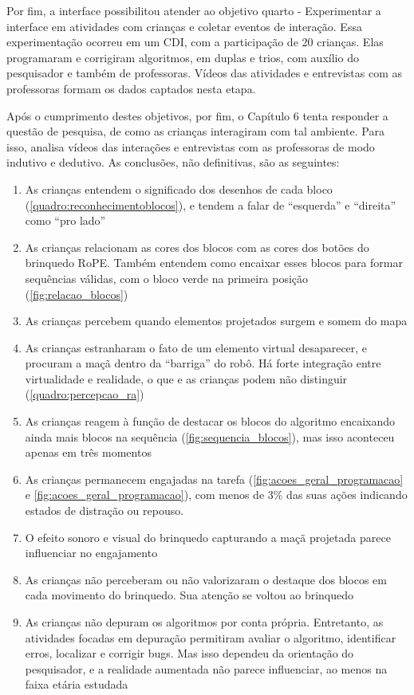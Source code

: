 Por fim, a interface possibilitou atender ao objetivo quarto - Experimentar a interface em atividades com crianças e coletar eventos de interação. Essa experimentação ocorreu em um CDI, com a participação de 20 crianças. Elas programaram e corrigiram algoritmos, em duplas e trios, com auxílio do pesquisador e também de professoras. Vídeos das atividades e entrevistas com as professoras formam os dados captados nesta etapa.

Após o cumprimento destes objetivos, por fim, o Capítulo 6 tenta responder a questão de pesquisa, de como as crianças interagiram com tal ambiente. Para isso, analisa vídeos das interações e entrevistas com as professoras de modo indutivo e dedutivo. As conclusões, não definitivas, são as seguintes:

\begin{enumerate}
    \item As crianças entendem o significado dos desenhos de cada bloco (\autoref{quadro:reconhecimentoblocos}), e tendem a falar de “esquerda” e “direita” como “pro lado”
    \item As crianças relacionam as cores dos blocos com as cores dos botões do brinquedo RoPE. Também entendem como encaixar esses blocos para formar sequências válidas, com o bloco verde na primeira posição (\autoref{fig:relacao_blocos})
    \item As crianças percebem quando elementos projetados surgem e somem do mapa
    \item As crianças estranharam o fato de um elemento virtual desaparecer, e procuram a maçã dentro da “barriga” do robô. Há forte integração entre virtualidade e realidade, o que e as crianças podem não distinguir (\autoref{quadro:percepcao_ra})
    \item As crianças reagem à função de destacar os blocos do algoritmo encaixando ainda mais blocos na sequência (\autoref{fig:sequencia_blocos}), mas isso aconteceu apenas em três momentos
    \item As crianças permanecem engajadas na tarefa (\autoref{fig:acoes_geral_programacao} e \autoref{fig:acoes_geral_programacao}), com menos de 3\% das suas ações indicando estados de distração ou repouso. 
    \item O efeito sonoro e visual do brinquedo capturando a maçã projetada parece influenciar no engajamento
    \item As crianças não perceberam ou não valorizaram o destaque dos blocos em cada movimento do brinquedo. Sua atenção se voltou ao brinquedo
    \item As crianças não depuram os algoritmos por conta própria. Entretanto, as atividades focadas em depuração permitiram avaliar o algoritmo, identificar erros, localizar e corrigir bugs. Mas isso dependeu da orientação do pesquisador, e a realidade aumentada não parece influenciar, ao menos na faixa etária estudada

\end{enumerate}
